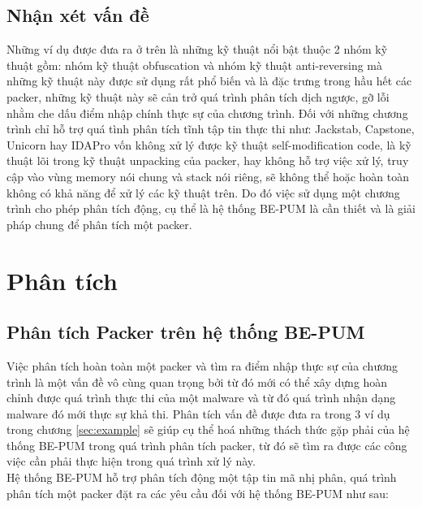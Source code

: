 \subsection{Nhận xét vấn đề}

\hspace{0.5cm}Những ví dụ được đưa ra ở trên là những kỹ thuật nổi bật thuộc 2 nhóm kỹ thuật gồm: nhóm kỹ thuật obfuscation và nhóm kỹ thuật anti-reversing mà những kỹ thuật này được sử dụng rất phổ biến và là đặc trưng trong hầu hết các packer, những kỹ thuật này sẽ cản trở quá trình phân tích dịch ngược, gỡ lỗi nhằm che dấu điểm nhập chính thực sự của chương trình. Đối với những chương trình chỉ hỗ trợ quá tình phân tích tĩnh tập tin thực thi như: Jackstab, Capstone, Unicorn hay IDAPro vốn không xử lý được kỹ thuật self-modification code, là kỹ thuật lõi trong kỹ thuật unpacking của packer, hay không hỗ trợ việc xử lý, truy cập vào vùng memory nói chung và stack nói riêng, sẽ không thể hoặc hoàn toàn không có khả năng để xử lý các kỹ thuật trên. Do đó việc sử dụng một chương trình cho phép phân tích động, cụ thể là hệ thống BE-PUM là cần thiết và là giải pháp chung để phân tích một packer.

\section{Phân tích}

\subsection {Phân tích Packer trên hệ thống BE-PUM}

\hspace{0.5cm}Việc phân tích hoàn toàn một packer và tìm ra điểm nhập thực sự của chương trình là một vấn đề vô cùng quan trọng bởi từ đó mới có thể xây dựng hoàn chỉnh được quá trình thực thi của một malware và từ đó quá trình nhận dạng malware đó mới thực sự khả thi. Phân tích vấn đề được đưa ra trong 3 ví dụ trong chương \ref {sec:example} sẽ giúp cụ thể hoá những thách thức gặp phải của hệ thống BE-PUM trong quá trình phân tích packer, từ đó sẽ tìm ra được các công việc cần phải thực hiện trong quá trình xử lý này.\\

\hspace{0.5cm}Hệ thống BE-PUM hỗ trợ phân tích động một tập tin mã nhị phân, quá trình phân tích một packer đặt ra các yêu cầu đối với hệ thống BE-PUM như sau:


